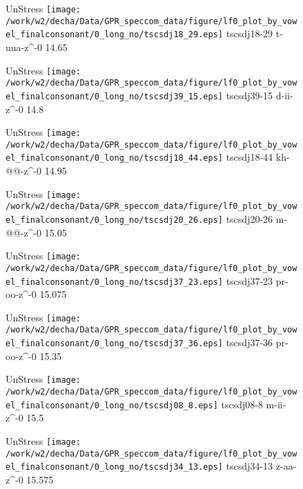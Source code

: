 \documentclass{article}
\begin{document}
\begin{figure}[t]
\begin{minipage}[b]{.24\textwidth}
UnStress
\centering
\texttt{[image: /work/w2/decha/Data/GPR\_speccom\_data/figure/lf0\_plot\_by\_vowel\_finalconsonant/0\_long\_no/tscsdj18\_29.eps]}
tscsdj18-29 t-uua-z\textasciicircum-0 14.65
\end{minipage}
\begin{minipage}[b]{.24\textwidth}
UnStress
\centering
\texttt{[image: /work/w2/decha/Data/GPR\_speccom\_data/figure/lf0\_plot\_by\_vowel\_finalconsonant/0\_long\_no/tscsdj39\_15.eps]}
tscsdj39-15 d-ii-z\textasciicircum-0 14.8
\end{minipage}
\begin{minipage}[b]{.24\textwidth}
UnStress
\centering
\texttt{[image: /work/w2/decha/Data/GPR\_speccom\_data/figure/lf0\_plot\_by\_vowel\_finalconsonant/0\_long\_no/tscsdj18\_44.eps]}
tscsdj18-44 kh-@@-z\textasciicircum-0 14.95
\end{minipage}
\begin{minipage}[b]{.24\textwidth}
UnStress
\centering
\texttt{[image: /work/w2/decha/Data/GPR\_speccom\_data/figure/lf0\_plot\_by\_vowel\_finalconsonant/0\_long\_no/tscsdj20\_26.eps]}
tscsdj20-26 m-@@-z\textasciicircum-0 15.05
\end{minipage}
\end{figure}

\begin{figure}[t]
\begin{minipage}[b]{.24\textwidth}
UnStress
\centering
\texttt{[image: /work/w2/decha/Data/GPR\_speccom\_data/figure/lf0\_plot\_by\_vowel\_finalconsonant/0\_long\_no/tscsdj37\_23.eps]}
tscsdj37-23 pr-oo-z\textasciicircum-0 15.075
\end{minipage}
\begin{minipage}[b]{.24\textwidth}
UnStress
\centering
\texttt{[image: /work/w2/decha/Data/GPR\_speccom\_data/figure/lf0\_plot\_by\_vowel\_finalconsonant/0\_long\_no/tscsdj37\_36.eps]}
tscsdj37-36 pr-oo-z\textasciicircum-0 15.35
\end{minipage}
\begin{minipage}[b]{.24\textwidth}
UnStress
\centering
\texttt{[image: /work/w2/decha/Data/GPR\_speccom\_data/figure/lf0\_plot\_by\_vowel\_finalconsonant/0\_long\_no/tscsdj08\_8.eps]}
tscsdj08-8 m-ii-z\textasciicircum-0 15.5
\end{minipage}
\begin{minipage}[b]{.24\textwidth}
UnStress
\centering
\texttt{[image: /work/w2/decha/Data/GPR\_speccom\_data/figure/lf0\_plot\_by\_vowel\_finalconsonant/0\_long\_no/tscsdj34\_13.eps]}
tscsdj34-13 z-aa-z\textasciicircum-0 15.575
\end{minipage}
\end{figure}
\end{document}
